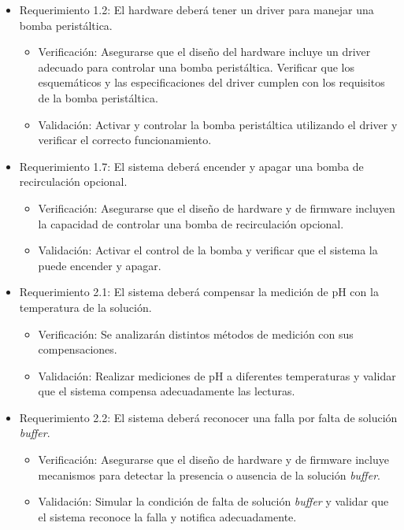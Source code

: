 \documentclass[
11pt, %
codirector, %
]{charter}
\begin{document}
\begin{itemize} 

\item Requerimiento 1.2: El hardware deberá tener un driver para manejar una bomba peristáltica.

\begin{itemize}
	\item Verificación: Asegurarse que el diseño del hardware incluye un driver adecuado para controlar una bomba peristáltica. Verificar que los esquemáticos y las especificaciones del driver cumplen con los requisitos de la bomba peristáltica.
	\item Validación: Activar y controlar la bomba peristáltica utilizando el driver y verificar el correcto funcionamiento.
\end{itemize}

\item Requerimiento 1.7: El sistema deberá encender y apagar una bomba de recirculación opcional.

\begin{itemize}
	\item Verificación: Asegurarse que el diseño de hardware y de firmware incluyen la capacidad de controlar una bomba de recirculación opcional.
	\item Validación: Activar el control de la bomba y verificar que el sistema la puede encender y apagar.
\end{itemize}

\item Requerimiento 2.1: El sistema deberá compensar la medición de pH con la temperatura de la solución.

\begin{itemize}
	\item Verificación: Se analizarán distintos métodos de medición con sus compensaciones.
	\item Validación: Realizar mediciones de pH a diferentes temperaturas y validar que el sistema compensa adecuadamente las lecturas.
\end{itemize}

\item Requerimiento 2.2: El sistema deberá reconocer una falla por falta de solución \textit{buffer}.

\begin{itemize}
	\item Verificación: Asegurarse que el diseño de hardware y de firmware incluye mecanismos para detectar la presencia o ausencia de la solución \textit{buffer}.
	\item Validación: Simular la condición de falta de solución \textit{buffer} y validar que el sistema reconoce la falla y notifica adecuadamente.
\end{itemize}


\end{itemize}
\end{document}
